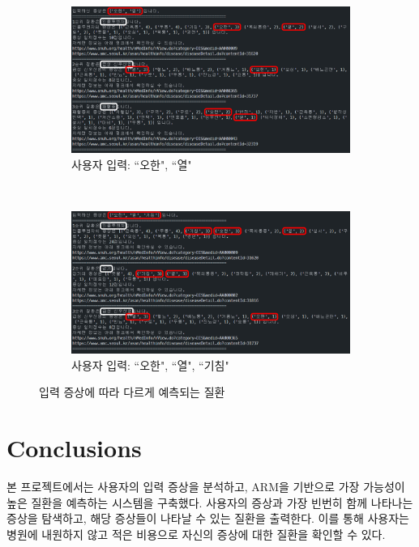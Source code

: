 \documentclass[conference]{IEEEtran}
\begin{document}
\begin{figure}
    \centering
    \begin{subfigure}[t]{0.49\textwidth}
        \includegraphics[width=\textwidth]{temp1.png}
        \caption{사용자 입력: ``오한", ``열"}
        \label{fig:2a}
    \end{subfigure}
    ~ %
    \begin{subfigure}[t]{0.49\textwidth}
        \includegraphics[width=\textwidth]{temp2.png}
        \caption{사용자 입력: ``오한", ``열", ``기침"}
        \label{fig:2b}
    \end{subfigure}
    \caption{입력 증상에 따라 다르게 예측되는 질환}\label{fig:animals}
    \label{fig:2}
\end{figure}

\section{Conclusions}
본 프로젝트에서는 사용자의 입력 증상을 분석하고, ARM을 기반으로 가장 가능성이 높은 질환을 예측하는 시스템을 구축했다. 사용자의 증상과 가장 빈번히 함께 나타나는 증상을 탐색하고, 해당 증상들이 나타날 수 있는 질환을 출력한다. 이를 통해 사용자는 병원에 내원하지 않고 적은 비용으로 자신의 증상에 대한 질환을 확인할 수 있다.
\end{document}
